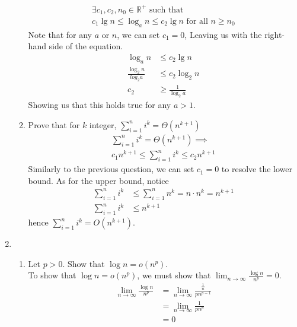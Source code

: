 \documentclass{article}
\begin{document}
\begin{enumerate}
\begin{enumerate}[label=\arabic*.]
\begin{align*}
                        \exists c_1, c_2, n_0 \in \mathbb{R}^+ \text{ such that } \\
                        c_1\lg n \leq \log_an \leq c_2\lg n \text{ for all } n \geq n_0
                    \end{align*}
                    Note that for any \(a\) or \(n\), we can set \(c_1 = 0\), Leaving us with the right-hand side of the equation.
                    \begin{align*}
                        \log_an                & \leq c_2 \lg n         \\
                        \frac{\log_2n}{log_2a} & \leq c_2 \log_2n       \\
                        c_2                    & \geq \frac{1}{\log_2a}
                    \end{align*}
                    Showing us that this holds true for any \(a > 1\).
                    \pagebreak
              \item Prove that for \(k\) integer, \(\sum_{i=1}^{n}{i^k} = \Theta(n^{k+1})\) \\
                    \begin{align*}
                        \sum_{i=1}^{n}{i^k} = \Theta(n^{k+1}) \implies \\
                        c_1n^{k+1} \leq \sum_{i=1}^{n}{i^k} \leq c_2n^{k+1}
                    \end{align*}
                    Similarly to the previous question, we can set \(c_1 = 0\) to resolve the lower bound.
                    As for the upper bound, notice
                    \begin{align*}
                        \sum_{i=1}^{n}{i^k} & \leq \sum_{i=1}^{n}{n^k} = n \cdot n^k = n^{k+1} \\
                        \sum_{i=1}^{n}{i^k} & \leq n^{k+1}
                    \end{align*}
                    hence \(\sum_{i=1}^{n}{i^k} = O(n^{k+1})\).
          \end{enumerate}
    \item  \begin{enumerate}[label=\arabic*.]
              \item Let \(p > 0\). Show that \(\log n = o(n^p)\). \\
                    To show that \(\log n = o(n^p)\), we must show that \(\lim_{n \to \infty}{\frac{\log n}{n^p}} = 0\).
                    \begin{align*}
                        \lim_{n \to \infty}{\frac{\log n}{n^p}} & = \lim_{n \to \infty}{\frac{\frac{1}{n}}{pn^{p-1}}} \\
                                                               & = \lim_{n \to \infty}{\frac{1}{pn^p}}                \\
                                                               & = 0
                    \end{align*}
          \end{enumerate}
\end{enumerate}
\end{document}
